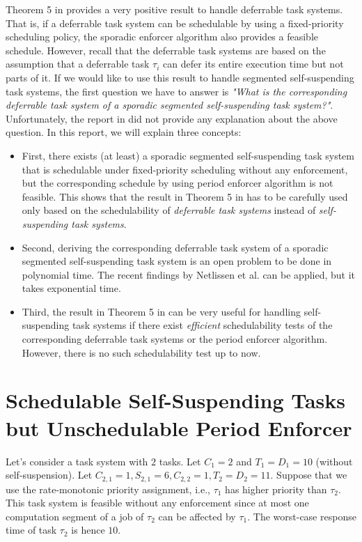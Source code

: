 Theorem 5 in \cite{Raj:suspension1991} provides a very positive result to handle deferrable task systems. That is, if a deferrable task system can be schedulable by using a fixed-priority scheduling policy, the sporadic enforcer algorithm also provides a feasible schedule. However, recall that the deferrable task systems are based on the assumption that a deferrable task $\tau_i$ can defer its entire execution time but not parts of it. If we would like to use this result to handle segmented self-suspending task systems, the first question we have to answer is \emph{"What is the corresponding deferrable task system of a sporadic segmented self-suspending task system?"}. Unfortunately, the report in \cite{Raj:suspension1991} did not provide any explanation about the above question. In this report, we will explain three concepts:
\begin{itemize}
\item First, there exists (at least) a sporadic segmented self-suspending task system that is schedulable under fixed-priority scheduling without any enforcement, but the corresponding schedule by using period enforcer algorithm is not feasible. This shows that the result in Theorem 5 in \cite{Raj:suspension1991} has to be carefully used only based on the schedulability of \emph{deferrable task systems} instead of \emph{self-suspending task systems}.
\item Second, deriving the corresponding deferrable task system of a sporadic segmented self-suspending task system is an open problem to be done in polynomial time. The recent findings by Netlissen et al. \cite{ecrts15nelissen} can be applied, but it takes exponential time.
\item Third, the result in Theorem 5 in \cite{Raj:suspension1991} can be very useful for handling self-suspending task systems if there exist \emph{efficient} schedulability tests of the corresponding deferrable task systems or the period enforcer algorithm. However, there is no such schedulability test up to now.
\end{itemize}

\section{Schedulable Self-Suspending Tasks but Unschedulable Period Enforcer}

Let's consider a task system with $2$ tasks. Let $C_1 = 2$ and $T_1=D_1=10$ (without self-suspension). Let $C_{2,1} = 1, S_{2,1} = 6, C_{2,2}=1, T_2=D_2=11$. Suppose that we use the rate-monotonic priority assignment, i.e., $\tau_1$ has higher priority than $\tau_2$. This task system is feasible without any enforcement since at most one computation segment of a job of $\tau_2$ can be affected by $\tau_1$. The worst-case response time of task $\tau_2$ is hence $10$. 

